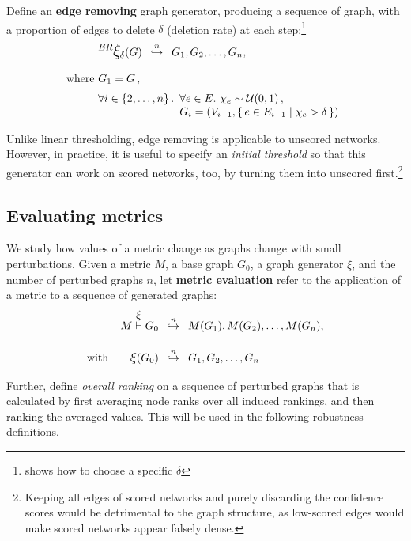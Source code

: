 Define an \textbf{edge removing} graph generator, producing a sequence of graph, with a proportion of edges to delete $\delta$ (deletion rate) at each step:\footnote{ shows how to choose a specific $\delta$}
\begin{align}
    &\mathlarger{^{ER} \mathlarger{\xi}}_\delta(G) \generates{n} G_1, G_2, \dots, G_n, \label{eq:edge_removing_generator}\\[6pt]
    \text{where}~& G_1 = G\,, \nonumber \\
    & \forall i \in \left\{2, \dots, n\right\}. \begin{array}[t]{l}
                                                    \forall e \in E.\ \chi_e\sim\mathcal{U}(0,1)\,, \\ G_i = \left( V_{i-1}, \Set{ e \in E_{i-1} }{ \chi_e > \delta }  \right)
    \end{array} \nonumber
\end{align}

Unlike linear thresholding, edge removing is applicable to unscored networks.
However, in practice, it is useful to specify an \textsl{initial threshold} so that this generator can work on scored networks, too, by turning them into unscored first.\footnote{Keeping all edges of scored networks and purely discarding the confidence scores would be detrimental to the graph structure, as low-scored edges would make scored networks appear falsely dense.}

\subsection{Evaluating metrics}\label{sec:evaluating_metrics}

We study how values of a metric change as graphs change with small perturbations.
Given a metric $M$, a base graph $G_0$, a graph generator $\xi$, and the number of perturbed graphs $n$, let \textbf{metric evaluation} refer to the application of a metric to a sequence of generated graphs:
\begin{align}
    M \overset{\mathlarger{\xi}}{\vdash} G_0 &\generates{n} M(G_1), M(G_2), \dots, M(G_n), \\[10pt]
    \text{with}\qquad \mathlarger{\xi}(G_0) &\generates{n} G_1, G_2, \dots, G_n \nonumber
\end{align}

Further, define \textsl{overall ranking} on a sequence of perturbed graphs that is calculated by first averaging node ranks over all induced rankings, and then ranking the averaged values.
This will be used in the following robustness definitions.

